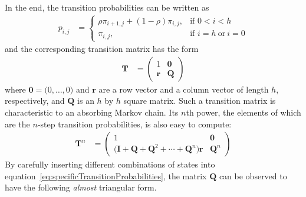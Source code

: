 In the end, the transition probabilities can be written as
\begin{align}\label{eq:specificTransitionProbabilities}
	p_{i,j} &= \begin{cases}
		\rho\pi_{i+1,j} + (1-\rho)\pi_{i,j},&\mbox{if } 0<i<h\\
		\pi_{i,j},&\mbox{if } i=h\ \mbox{or}\ i=0
	\end{cases}
\end{align}
and the corresponding transition matrix has the form
\begin{align}\label{eq:transitionMatrixShape}
	\mathbf{T} &=
	\begin{pmatrix}
		1 & \mathbf{0} \\
		\mathbf{r} & \mathbf{Q}
	\end{pmatrix}
\end{align}
where $\mathbf{0} = \big(0,\ldots,0\big)$ and $\mathbf{r}$ are a row vector and a column vector of length $h$, respectively, and $\mathbf{Q}$ is an $h$ by $h$ square matrix. Such a transition matrix is characteristic to an absorbing Markov chain. Its $n$th power, the elements of which are the $n$-step transition probabilities, is also easy to compute:
\begin{align}
	\mathbf{T}^n &=
	\begin{pmatrix}
		1 & \mathbf{0} \\
		\big(\mathbf{I}+\mathbf{Q}+\mathbf{Q}^2+\cdots+\mathbf{Q}^n\big)\mathbf{r} & \mathbf{Q}^n
	\end{pmatrix}
\end{align}
By carefully inserting different combinations of states into equation~\ref{eq:specificTransitionProbabilities}, the matrix $\mathbf{Q}$ can be observed to have the following \emph{almost} triangular form.
\setcounter{MaxMatrixCols}{20}
